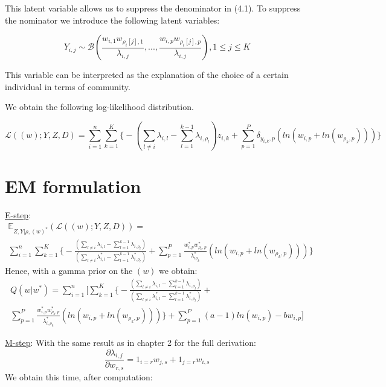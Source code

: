 \documentclass[12pt]{ociamthesis}  %
\begin{document}
	This latent variable allows us to suppress the denominator in (4.1). To suppress the nominator we introduce the following latent variables:
	
	\begin{equation}
	Y_{i,j} \sim \mathcal{B}(\frac{w_{i,1}w_{\rho_{i}[j],1}}{\lambda_{i,j}}, ..., \frac{w_{i,p}w_{\rho_{i}[j],p}}{\lambda_{i,j}}), 1 \leq j \leq K
	\end{equation}
	
	This variable can be interpreted as the explanation of the choice of a certain individual in terms of community.
	
	We obtain the following log-likelihood distribution.
	
	\begin{equation}
	\mathcal{L}((w);Y,Z,D) = \sum_{i = 1}^{n} \sum_{k = 1}^{K} \bigg\{ -(\sum_{l \neq i} \lambda_{i,l} - \sum_{l = 1}^{k - 1} \lambda_{i,\rho_{l}})z_{i,k} + \sum_{p = 1}^{P} \delta_{y_{i,k}, p} (ln(w_{i,p} + ln(w_{\rho_{k},p}))) \bigg\}
	\end{equation}
	
	\section{EM formulation}
	
	\underline{E-step}:
	\begin{multline}
	\mathbb{E}_{Z,Y | \rho, (w)^{*}}(\mathcal{L}((w);Y,Z,D)) = \\ \sum_{i = 1}^{n} \sum_{k = 1}^{K} \bigg\{ -\frac{(\sum_{l \neq i} \lambda_{i,l} - \sum_{l = 1}^{k - 1} \lambda_{i,\rho_{l}})}{(\sum_{l \neq i} \lambda^{*}_{i,l} - \sum_{l = 1}^{k - 1} \lambda^{*}_{i,\rho_{l}})} + \sum_{p = 1}^{P} \frac{w^{*}_{i,p}w^{*}_{\rho_{k},p}}{\lambda^{*}_{i\rho_{k}}} (ln(w_{i,p} + ln(w_{\rho_{k},p}))) \bigg\}
	\end{multline} Hence, with a gamma prior on the $(w)$ we obtain:
	\begin{multline}
	Q(w|w^{*}) = \sum_{i = 1}^{n} \Bigg[ \sum_{k = 1}^{K} \bigg\{ -\frac{(\sum_{l \neq i} \lambda_{i,l} - \sum_{l = 1}^{k - 1} \lambda_{i,\rho_{l}})}{(\sum_{l \neq i} \lambda^{*}_{i,l} - \sum_{l = 1}^{k - 1} \lambda^{*}_{i,\rho_{l}})} + \\ \sum_{p = 1}^{P} \frac{w^{*}_{i,p}w^{*}_{\rho_{k},p}}{\lambda^{*}_{i,\rho_{k}}} (ln(w_{i,p} + ln(w_{\rho_{k},p}))) \bigg\} + \sum_{p = 1}^{P} (a-1)ln(w_{i,p}) - bw_{i,p}  \Bigg]
	\end{multline}
	
	\underline{M-step}: With the same result as in chapter 2 for the full derivation:
	\begin{equation}
	\frac{\partial \lambda_{i,j}}{\partial w_{r,s}} = 1_{i = r} w_{j,s} + 1_{j = r} w_{i,s}
	\end{equation}
	We obtain this time, after computation:
	
\end{document}
